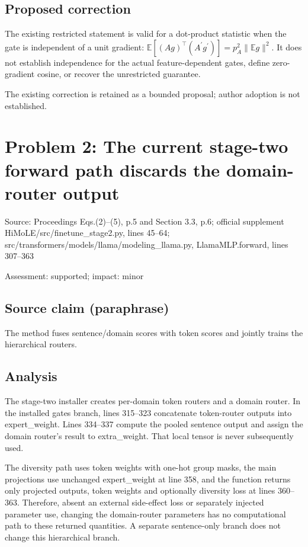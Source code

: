 \documentclass[11pt]{article}
\begin{document}
\subsection*{Proposed correction}

The existing restricted statement is valid for a dot-product statistic when the gate is independent of a unit gradient: \(\mathbb E[(Ag)^\top(A^{\prime}g^{\prime})]=p_A^2\|\mathbb Eg\|^2\). It does not establish independence for the actual feature-dependent gates, define zero-gradient cosine, or recover the unrestricted guarantee.

The existing correction is retained as a bounded proposal; author adoption is not established.

\section*{Problem 2: The current stage-two forward path discards the domain-router output}

Source: Proceedings Eqs.(2)–(5), p.5 and Section 3.3, p.6; official supplement HiMoLE/src/finetune\_stage2.py, lines 45–64; src/transformers/models/llama/modeling\_llama.py, LlamaMLP.forward, lines 307–363

Assessment: supported; impact: minor

\subsection*{Source claim (paraphrase)}

The method fuses sentence/domain scores with token scores and jointly trains the hierarchical routers.

\subsection*{Analysis}

The stage-two installer creates per-domain token routers and a domain router. In the installed gates branch, lines 315–323 concatenate token-router outputs into expert\_weight. Lines 334–337 compute the pooled sentence output and assign the domain router’s result to extra\_weight. That local tensor is never subsequently used.

The diversity path uses token weights with one-hot group masks, the main projections use unchanged expert\_weight at line 358, and the function returns only projected outputs, token weights and optionally diversity loss at lines 360–363. Therefore, absent an external side-effect loss or separately injected parameter use, changing the domain-router parameters has no computational path to these returned quantities. A separate sentence-only branch does not change this hierarchical branch.
\end{document}
